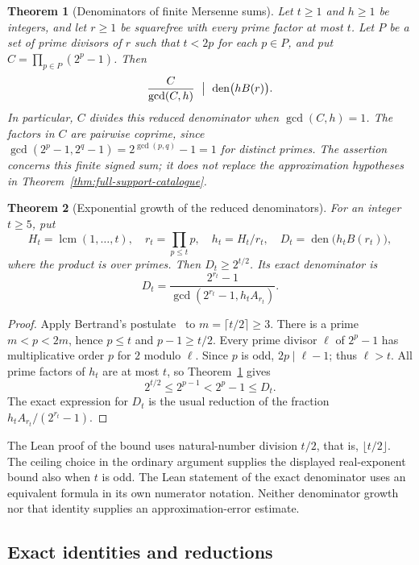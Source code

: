 \documentclass[11pt]{article}
\theoremstyle{plain}
\newtheorem{thm}{Theorem}[section]
\theoremstyle{definition}
\theoremstyle{remark}
\begin{document}
\begin{thm}[Denominators of finite Mersenne sums]
\label{thm:mersenne-channel-survival}
Let $t\ge1$ and $h\ge1$ be integers, and let $r\ge1$ be
squarefree with every prime factor at most $t$.  Let $P$ be a set of
prime divisors of $r$ such that $t<2p$ for each $p\in P$, and put
$C=\prod_{p\in P}(2^p-1)$.  Then
\[
 \frac{C}{\gcd(C,h)}\ \bigm|\ \operatorname{den}\bigl(hB(r)\bigr).
\]
In particular, $C$ divides this reduced denominator when
$\gcd(C,h)=1$.  The factors in $C$ are pairwise coprime, since
$\gcd(2^p-1,2^q-1)=2^{\gcd(p,q)}-1=1$ for distinct primes.
The assertion concerns this finite signed sum; it does not replace
the approximation hypotheses in Theorem~\ref{thm:full-support-catalogue}.
\end{thm}

\begin{thm}[Exponential growth of the reduced denominators]
\label{thm:mersenne-channel-growth}
For an integer $t\ge5$, put
\[
 H_t=\operatorname{lcm}(1,\ldots,t),\quad
 r_t=\prod_{p\le t}p,\quad h_t=H_t/r_t,\quad
 D_t=\operatorname{den}\bigl(h_tB(r_t)\bigr),
\]
where the product is over primes.  Then $D_t\ge2^{t/2}$.
Its exact denominator is
\[
 D_t=\frac{2^{r_t}-1}{\gcd(2^{r_t}-1,h_tA_{r_t})}.
\]
\end{thm}
\begin{proof}
Apply Bertrand's postulate~\cite[\S\S4--5, pp.~197--198]{erdos1932bertrand} to $m=\lceil t/2\rceil\ge3$.
There is a prime $m<p<2m$, hence $p\le t$ and $p-1\ge t/2$.
Every prime divisor $\ell$ of $2^p-1$ has multiplicative order
$p$ for $2$ modulo $\ell$.  Since $p$ is odd, $2p\mid\ell-1$;
thus $\ell>t$.  All prime factors of $h_t$ are at most $t$, so
Theorem~\ref{thm:mersenne-channel-survival} gives
\[
 2^{t/2}\le2^{p-1}<2^p-1\le D_t.
\]
The exact expression for $D_t$ is the usual reduction of the
fraction $h_tA_{r_t}/(2^{r_t}-1)$.
\end{proof}
The Lean proof of the bound uses natural-number division $t/2$,
that is, $\lfloor t/2\rfloor$.  The ceiling choice in the ordinary
argument supplies the displayed real-exponent bound also when $t$
is odd.  The Lean statement of the exact denominator uses an
equivalent formula in its own numerator notation.  Neither denominator growth nor
that identity supplies an approximation-error estimate.

\subsection{Exact identities and reductions}
\end{document}
